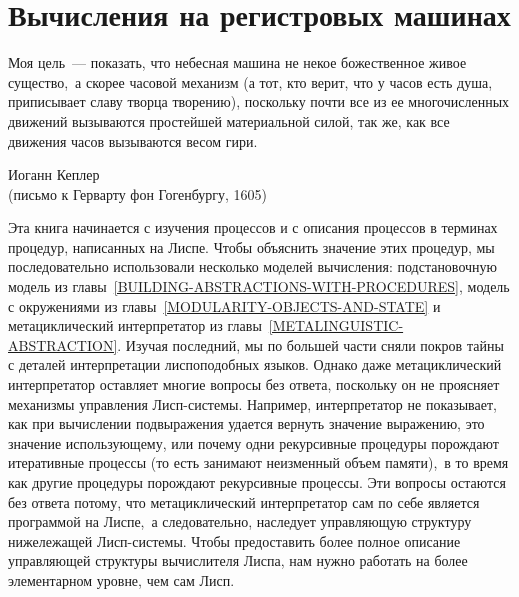 \chapter{Вычисления на регистровых машинах}
\label{COMPUTING-WITH-REGISTER-MACHINES}
\thispagestyle{empty}
\epigraph{

Моя цель~--- показать, что небесная машина не некое божественное
живое существо,~а скорее часовой механизм (а тот, кто верит, что у
часов есть душа, приписывает славу творца творению), 
поскольку почти все из ее многочисленных движений вызываются
простейшей материальной силой, так же, как все движения часов
вызываются весом гири.
%
}%
{Иоганн Кеплер \\
(письмо к Герварту фон Гогенбургу, 1605)}

Эта книга начинается с изучения процессов и с описания процессов в
терминах процедур, написанных на Лиспе.  Чтобы объяснить значение этих
процедур, мы последовательно использовали несколько моделей
вычисления: подстановочную модель из 
главы~\ref{BUILDING-ABSTRACTIONS-WITH-PROCEDURES}, модель с
окружениями из главы~\ref{MODULARITY-OBJECTS-AND-STATE} и
метациклический интерпретатор из главы~\ref{METALINGUISTIC-ABSTRACTION}.  
Изучая последний,
мы по большей части сняли покров тайны с деталей интерпретации
лиспоподобных языков.  Однако даже
метациклический интерпретатор оставляет многие вопросы без ответа,
поскольку он не проясняет механизмы управления Лисп-системы.  Например,
интерпретатор не показывает, как при вычислении подвыражения удается
вернуть значение выражению, это значение использующему, или почему одни
рекурсивные процедуры порождают итеративные процессы (то есть
занимают неизменный объем памяти),~в то время как другие процедуры
порождают рекурсивные процессы.  Эти вопросы остаются без ответа
потому, что метациклический интерпретатор сам по себе является
программой на Лиспе,~а следовательно, наследует управляющую структуру
нижележащей Лисп-системы. Чтобы предоставить более полное описание
управляющей структуры вычислителя Лиспа, нам нужно работать на более
элементарном уровне, чем сам Лисп.

